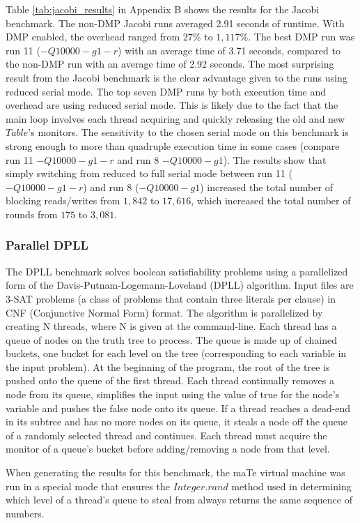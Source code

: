 Table \ref{tab:jacobi_results} in Appendix B shows the results for the
Jacobi benchmark.  The non-DMP Jacobi runs averaged 2.91 seconds of
runtime.  With DMP enabled, the overhead ranged from $27\%$ to
$1,117\%$.  The best DMP run was run 11 ($-Q10000 -g1 -r$) with an
average time of 3.71 seconds, compared to the non-DMP run with an
average time of 2.92 seconds.  The most surprising result from the
Jacobi benchmark is the clear advantage given to the runs using
reduced serial mode.  The top seven DMP runs by both execution time
and overhead are using reduced serial mode.  This is likely due to the
fact that the main loop involves each thread acquiring and quickly
releasing the old and new $Table$'s monitors.  The sensitivity to the
chosen serial mode on this benchmark is strong enough to more than
quadruple execution time in some cases (compare run 11 $-Q10000 -g1
-r$ and run 8 $-Q10000 -g1$).  The results show that simply switching
from reduced to full serial mode between run 11 ($-Q10000 -g1 -r$) and
run 8 ($-Q10000 -g1$) increased the total number of blocking
reads/writes from $1,842$ to $17,616$, which increased the total
number of rounds from $175$ to $3,081$.

\subsubsection{Parallel DPLL}

The DPLL benchmark solves boolean satisfiability problems using a
parallelized form of the Davis-Putnam-Logemann-Loveland (DPLL)
algorithm.  Input files are 3-SAT problems (a class of problems that
contain three literals per clause) in CNF (Conjunctive Normal Form)
format.  The algorithm is parallelized by creating N threads, where N
is given at the command-line.  Each thread has a queue of nodes on the
truth tree to process.  The queue is made up of chained buckets, one
bucket for each level on the tree (corresponding to each variable in
the input problem).  At the beginning of the program, the root of the
tree is pushed onto the queue of the first thread.  Each thread
continually removes a node from its queue, simplifies the input using
the value of true for the node's variable and pushes the false node
onto its queue.  If a thread reaches a dead-end in its subtree and has
no more nodes on its queue, it steals a node off the queue of a
randomly selected thread and continues.  Each thread must acquire the
monitor of a queue's bucket before adding/removing a node from that
level.

When generating the results for this benchmark, the maTe virtual
machine was run in a special mode that ensures the $Integer.rand$
method used in determining which level of a thread's queue to steal
from always returns the same sequence of numbers.

